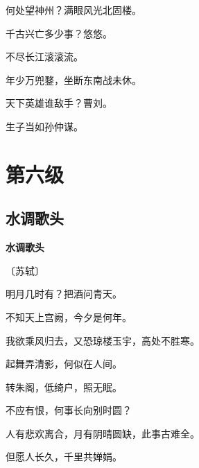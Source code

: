 \documentclass[12pt,UTF-8,openany,fontset=none]{ctexbook}
\begin{document}
    \vspace{18pt}  %

\begin{center}
    \begin{Large}

        何处望神州？满眼风光北固楼。

        千古兴亡多少事？悠悠。

        不尽长江滚滚流。

        \vspace{18pt}  %

        年少万兜鍪，坐断东南战未休。

        天下英雄谁敌手？曹刘。

        生子当如孙仲谋。

    \end{Large}

\end{center}

\vspace{8pt}
\clearpage

\chapter{第六级}
\clearpage

\section{水调歌头}


\begin{center}
    {\bfseries 水调歌头}

    \vspace{18pt}

    \begin{large}\xuwen
        〔苏轼〕
    \end{large}

\end{center}

    \vspace{18pt}  %

\begin{center}
    \begin{Large}

        明月几时有？把酒问青天。

        不知天上宫阙，今夕是何年。

        我欲乘风归去，又恐琼楼玉宇，高处不胜寒。

        起舞弄清影，何似在人间。

        \vspace{18pt}  %

        转朱阁，低绮户，照无眠。

        不应有恨，何事长向别时圆？

        人有悲欢离合，月有阴晴圆缺，此事古难全。

        但愿人长久，千里共婵娟。

    \end{Large}

\end{center}
\end{document}
